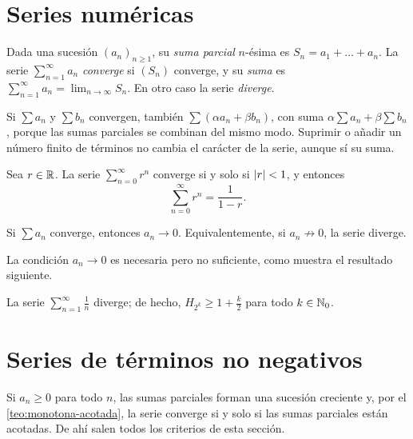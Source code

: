 \addtocounter{definicion}{1}%

\section{Series numéricas}

\begin{definicion}[Serie]\label{def:serie}
Dada una sucesión $(a_n)_{n\ge1}$, su \emph{suma parcial} $n$-ésima es $S_n=a_1+\dots+a_n$. La serie $\sum_{n=1}^{\infty}a_n$ \emph{converge} si $(S_n)$ converge, y su \emph{suma} es $\sum_{n=1}^{\infty}a_n=\lim_{n\to\infty}S_n$. En otro caso la serie \emph{diverge}.
\end{definicion}

Si $\sum a_n$ y $\sum b_n$ convergen, también $\sum(\alpha a_n+\beta b_n)$, con suma $\alpha\sum a_n+\beta\sum b_n$, porque las sumas parciales se combinan del mismo modo. Suprimir o añadir un número finito de términos no cambia el carácter de la serie, aunque sí su suma.

\begin{teorema}\label{teo:geometrica}
Sea $r\in\mathbb{R}$. La serie $\sum_{n=0}^{\infty}r^{n}$ converge si y solo si $\lvert r\rvert<1$, y entonces
\[
\sum_{n=0}^{\infty}r^{n}=\frac{1}{1-r}.
\]
\end{teorema}

\begin{proposicion}\label{prop:condicion-necesaria}
Si $\sum a_n$ converge, entonces $a_n\to0$. Equivalentemente, si $a_n\not\to0$, la serie diverge.
\end{proposicion}

La condición $a_n\to0$ es necesaria pero no suficiente, como muestra el resultado siguiente.

\begin{teorema}\label{teo:armonica}
La serie $\sum_{n=1}^{\infty}\frac1n$ diverge; de hecho, $H_{2^{k}}\ge1+\frac k2$ para todo $k\in\mathbb{N}_0$.
\end{teorema}

\addtocounter{definicion}{1}%

\section{Series de términos no negativos}

Si $a_n\ge0$ para todo $n$, las sumas parciales forman una sucesión creciente y, por el \cref{teo:monotona-acotada}, la serie converge si y solo si las sumas parciales están acotadas. De ahí salen todos los criterios de esta sección.


